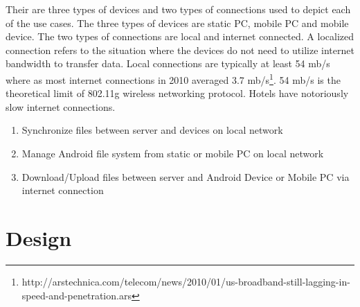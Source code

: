 \documentclass[12pt]{article}
\begin{document}
Their are three types of devices and two types of connections used to depict each of the use cases.  The three types of devices are static PC, mobile PC and mobile device.  The two types of connections are local and internet connected. A localized connection refers to the situation where the devices do not need to utilize internet bandwidth to transfer data.  Local connections are typically at least 54 mb/s where as most internet connections in 2010 averaged 3.7 mb/s\footnote{http://arstechnica.com/telecom/news/2010/01/us-broadband-still-lagging-in-speed-and-penetration.ars}. 54 mb/s is the theoretical limit of 802.11g wireless networking protocol. Hotels have notoriously slow internet connections.

\begin{enumerate}
\item Synchronize files between server and devices on local network
\item Manage Android file system from static or mobile PC on local network
\item Download/Upload files between server and Android Device or Mobile PC via internet connection
\end{enumerate}

\section{Design}
\end{document}
